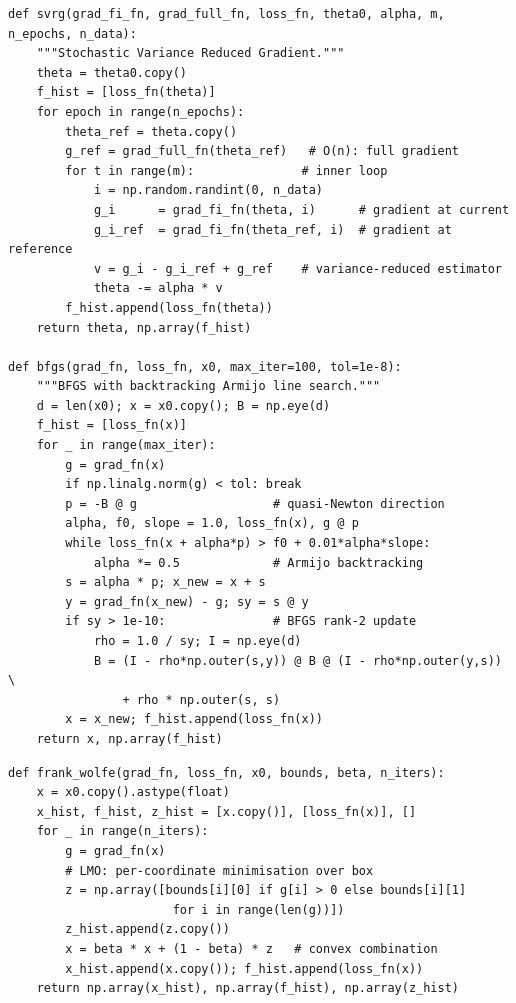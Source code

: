 \documentclass[11pt,a4paper]{article}
\theoremstyle{definition}
\begin{document}
\begin{lstlisting}[caption={SVRG and BFGS (Illustrative Implementations)}]
def svrg(grad_fi_fn, grad_full_fn, loss_fn, theta0, alpha, m, n_epochs, n_data):
    """Stochastic Variance Reduced Gradient."""
    theta = theta0.copy()
    f_hist = [loss_fn(theta)]
    for epoch in range(n_epochs):
        theta_ref = theta.copy()
        g_ref = grad_full_fn(theta_ref)   # O(n): full gradient
        for t in range(m):               # inner loop
            i = np.random.randint(0, n_data)
            g_i      = grad_fi_fn(theta, i)      # gradient at current
            g_i_ref  = grad_fi_fn(theta_ref, i)  # gradient at reference
            v = g_i - g_i_ref + g_ref    # variance-reduced estimator
            theta -= alpha * v
        f_hist.append(loss_fn(theta))
    return theta, np.array(f_hist)

def bfgs(grad_fn, loss_fn, x0, max_iter=100, tol=1e-8):
    """BFGS with backtracking Armijo line search."""
    d = len(x0); x = x0.copy(); B = np.eye(d)
    f_hist = [loss_fn(x)]
    for _ in range(max_iter):
        g = grad_fn(x)
        if np.linalg.norm(g) < tol: break
        p = -B @ g                   # quasi-Newton direction
        alpha, f0, slope = 1.0, loss_fn(x), g @ p
        while loss_fn(x + alpha*p) > f0 + 0.01*alpha*slope:
            alpha *= 0.5             # Armijo backtracking
        s = alpha * p; x_new = x + s
        y = grad_fn(x_new) - g; sy = s @ y
        if sy > 1e-10:               # BFGS rank-2 update
            rho = 1.0 / sy; I = np.eye(d)
            B = (I - rho*np.outer(s,y)) @ B @ (I - rho*np.outer(y,s)) \
                + rho * np.outer(s, s)
        x = x_new; f_hist.append(loss_fn(x))
    return x, np.array(f_hist)
\end{lstlisting}

\begin{lstlisting}[caption={Frank--Wolfe Algorithm}]
def frank_wolfe(grad_fn, loss_fn, x0, bounds, beta, n_iters):
    x = x0.copy().astype(float)
    x_hist, f_hist, z_hist = [x.copy()], [loss_fn(x)], []
    for _ in range(n_iters):
        g = grad_fn(x)
        # LMO: per-coordinate minimisation over box
        z = np.array([bounds[i][0] if g[i] > 0 else bounds[i][1]
                       for i in range(len(g))])
        z_hist.append(z.copy())
        x = beta * x + (1 - beta) * z   # convex combination
        x_hist.append(x.copy()); f_hist.append(loss_fn(x))
    return np.array(x_hist), np.array(f_hist), np.array(z_hist)
\end{lstlisting}
\end{document}
